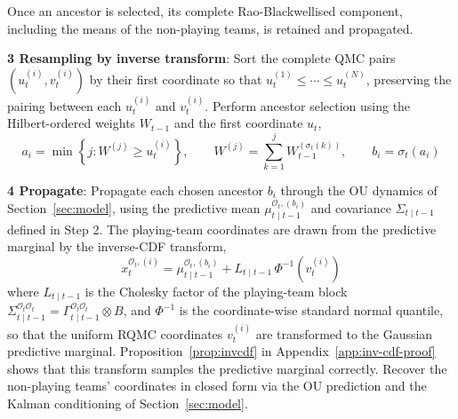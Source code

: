 Once an ancestor is selected, its complete Rao-Blackwellised component, including the means of the non-playing teams, is retained and propagated.



\textbf{3 Resampling by inverse transform}: Sort the complete QMC pairs $(u_t^{(i)}, v_t^{(i)})$ by their first coordinate so that $u_t^{(1)} \le \cdots \le u_t^{(N)}$, preserving the pairing between each $u_t^{(i)}$ and $v_t^{(i)}$. Perform ancestor selection using the Hilbert-ordered weights $W_{t-1}$ and the first coordinate $u_t$,
\begin{equation}
    a_i = \min \left\{ j : W^{(j)} \ge u_t^{(i)} \right\}, \qquad W^{(j)} = \sum_{k=1}^{j} W_{t-1}^{(\sigma_t(k))}, \qquad b_i = \sigma_t(a_i) \nonumber
\end{equation}

\textbf{4 Propagate}: Propagate each chosen ancestor $b_i$ through the OU dynamics of Section~\ref{sec:model}, using the predictive mean $\mu_{t\mid t-1}^{\mathcal{O}_t,(b_i)}$ and covariance $\Sigma_{t\mid t-1}$ defined in Step 2. The playing-team coordinates are drawn from the predictive marginal by the inverse-CDF transform,
\begin{equation}
    x_t^{\mathcal{O}_t,(i)} = \mu_{t\mid t-1}^{\mathcal{O}_t,(b_i)} + L_{t\mid t-1}\, \Phi^{-1}\left( v_t^{(i)} \right) \nonumber
\end{equation}
where $L_{t\mid t-1}$ is the Cholesky factor of the playing-team block $\Sigma_{t\mid t-1}^{\mathcal{O}_t\mathcal{O}_t} = \Gamma_{t\mid t-1}^{\mathcal{O}_t\mathcal{O}_t} \otimes B$, and $\Phi^{-1}$ is the coordinate-wise standard normal quantile, so that the uniform RQMC coordinates $v_t^{(i)}$ are transformed to the Gaussian predictive marginal. Proposition~\ref{prop:invcdf} in Appendix~\ref{app:inv-cdf-proof} shows that this transform samples the predictive marginal correctly. Recover the non-playing teams' coordinates in closed form via the OU prediction and the Kalman conditioning of Section~\ref{sec:model}.

